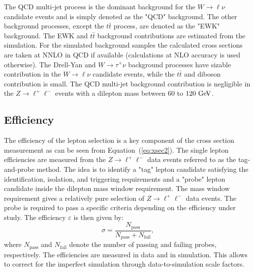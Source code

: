 The QCD multi-jet process is the dominant background for the $W \rightarrow \ell\nu$ candidate events and is simply denoted as the "QCD" background.  The other background processes, except the $t\bar{t}$ process, are denoted as the "EWK" background. The EWK and $t\bar{t}$ background contributions are estimated from the simulation. For the simulated background samples the calculated cross sections are taken at NNLO in QCD if available (calculations at NLO accuracy is used otherwise). The  Drell-Yan and $W \rightarrow \tau^{+}\nu$ background processes have sizable contribution in the $W \rightarrow \ell\nu$ candidate events, while the $t\bar{t}$ and diboson contribution is small. The QCD multi-jet background contribution is negligible in the $Z \rightarrow \ell^{+}\ell^{-}$ events with a dilepton mass between $60$ to $120~\mathrm{Ge\kern -0.1em V}$.    

\subsection{Efficiency}

The efficiency of the lepton selection is a key component of the cross section measurement as can be seen from Equation~(\ref{eq:xsec2}). The single lepton efficiencies are measured from the $Z \rightarrow \ell^{+}\ell^{-}$ data events referred to as the tag-and-probe method. The idea is to identify a "tag" lepton candidate satisfying the identification, isolation, and triggering requirements and a "probe" lepton candidate inside the dilepton mass window requirement. The mass window requirement gives a relatively pure selection of  $Z \rightarrow \ell^{+}\ell^{-}$ data events. The probe is required to pass a specific criteria depending on the efficiency under study. The efficiency $\varepsilon$ is then given by:
\begin{equation} \label{eq:eff}
\sigma = \frac{N_{\mathrm{pass}}}{N_{\mathrm{pass}}+N_{\mathrm{fail}}},
\end{equation}
where $N_{\mathrm{pass}}$ and $N_{\mathrm{fail}}$ denote the number of passing and failing probes, respectively. The efficiencies are measured in data and in simulation. This allows to correct for the imperfect simulation through data-to-simulation scale factors.   

